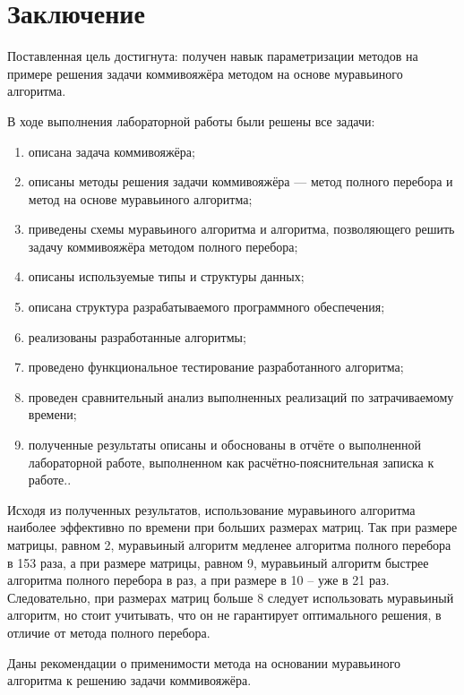 \chapter*{Заключение}

Поставленная цель достигнута: получен навык параметризации методов на примере решения задачи коммивояжёра методом на основе муравьиного алгоритма. 

В ходе выполнения лабораторной работы были решены все задачи:

\begin{enumerate}[label=\arabic*)]
\item описана задача коммивояжёра;
\item описаны методы решения задачи коммивояжёра --- метод полного перебора и метод на основе муравьиного алгоритма;
\item приведены схемы муравьиного алгоритма и алгоритма, позволяющего решить задачу коммивояжёра методом полного перебора;
\item описаны используемые типы и структуры данных;
\item описана структура разрабатываемого программного обеспечения;
\item реализованы разработанные алгоритмы;
\item проведено функциональное тестирование разработанного алгоритма;
\item проведен сравнительный анализ выполненных реализаций по затрачиваемому времени;
\item полученные результаты описаны и обоснованы в отчёте о выполненной лабораторной работе, выполненном как расчётно-пояснительная записка к работе..
\end{enumerate}

Исходя из полученных результатов, использование муравьиного алгоритма наиболее эффективно по времени при больших размерах матриц. Так при размере матрицы, равном 2, муравьиный алгоритм медленее алгоритма полного перебора в 153 раза, а при размере матрицы, равном 9, муравьиный алгоритм быстрее алгоритма полного перебора в раз, а при размере в 10 -- уже в 21 раз. Следовательно, при размерах матриц больше 8 следует использовать муравьиный алгоритм, но стоит учитывать, что он не гарантирует оптимального решения, в отличие от метода полного перебора.

Даны рекомендации о применимости метода на основании муравьиного алгоритма к решению задачи коммивояжёра. 
